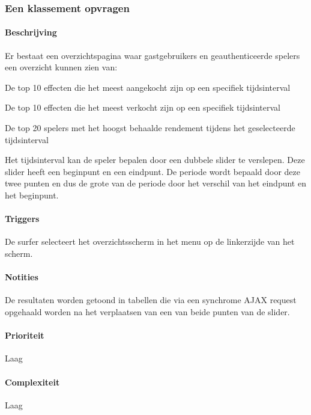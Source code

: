 \subsubsection{Een klassement opvragen}
\begin{compact}

\paragraph{Beschrijving} Er bestaat een overzichtspagina waar gastgebruikers en geauthenticeerde spelers een overzicht kunnen zien van:
\begin{itemize_compact}
	\item De top 10 effecten die het meest aangekocht zijn op een specifiek tijdsinterval
	\item De top 10 effecten die het meest verkocht zijn op een specifiek tijdsinterval
	\item De top 20 spelers met het hoogst behaalde rendement tijdens het geselecteerde tijdsinterval
\end{itemize_compact}
Het tijdsinterval kan de speler bepalen door een dubbele slider te verslepen. Deze slider heeft een beginpunt en een eindpunt. De periode wordt bepaald door deze twee punten en dus de grote van de periode door het verschil van het eindpunt en het beginpunt.
\paragraph{Triggers} De surfer selecteert het overzichtsscherm in het menu op de linkerzijde van het scherm.
\paragraph{Notities} De resultaten worden getoond in tabellen die via een synchrome AJAX request opgehaald worden na het verplaatsen van een van beide punten van de slider.
\paragraph{Prioriteit}Laag
\paragraph{Complexiteit}Laag
\end{compact}

